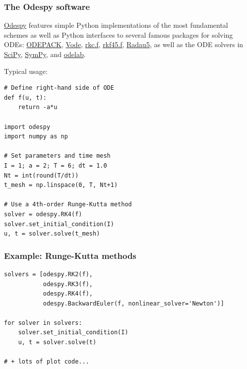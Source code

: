 \documentclass{beamer}
\begin{document}
\begin{frame}
\frametitle{The Odespy software}

\href{{https://github.com/hplgit/odespy}}{Odespy}
features simple Python implementations of the most fundamental
schemes as well as Python interfaces to several famous packages for
solving ODEs: \href{{https://computation.llnl.gov/casc/odepack/odepack_home.html}}{ODEPACK},
\href{{https://computation.llnl.gov/casc/odepack/odepack_home.html}}{Vode},
\href{{http://www.netlib.org/ode/rkc.f}}{rkc.f},
\href{{http://www.netlib.org/ode/rkf45.f}}{rkf45.f},
\href{{http://www.unige.ch/~hairer/software.html}}{Radau5}, as well
as the ODE solvers in
\href{{http://docs.scipy.org/doc/scipy/reference/generated/scipy.integrate.ode.html}}{SciPy},
\href{{http://docs.sympy.org/dev/modules/mpmath/calculus/odes.html}}{SymPy}, and
\href{{http://olivierverdier.github.com/odelab/}}{odelab}.

Typical usage:

\begin{verbatim}
# Define right-hand side of ODE
def f(u, t):
    return -a*u

import odespy
import numpy as np

# Set parameters and time mesh
I = 1; a = 2; T = 6; dt = 1.0
Nt = int(round(T/dt))
t_mesh = np.linspace(0, T, Nt+1)

# Use a 4th-order Runge-Kutta method
solver = odespy.RK4(f)
solver.set_initial_condition(I)
u, t = solver.solve(t_mesh)
\end{verbatim}
\end{frame}

\begin{frame}
\frametitle{Example: Runge-Kutta methods}

\begin{verbatim}
solvers = [odespy.RK2(f),
           odespy.RK3(f),
           odespy.RK4(f),
           odespy.BackwardEuler(f, nonlinear_solver='Newton')]

for solver in solvers:
    solver.set_initial_condition(I)
    u, t = solver.solve(t)

# + lots of plot code...
\end{verbatim}
\end{frame}
\end{document}

